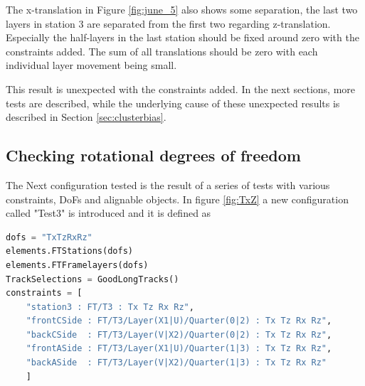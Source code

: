 The x-translation in Figure \ref{fig:june_5} also shows some separation, the last two layers in station 3 are separated from the first two regarding z-translation. Especially the half-layers in the last station should be fixed around zero with the constraints added. The sum of all translations should be zero with each individual layer movement being small.

This result is unexpected with the constraints added. In the next sections, more tests are described, while the underlying cause of these unexpected results is described in Section \ref{sec:clusterbias}.

\subsection{Checking rotational degrees of freedom}
\label{sec:test_and_c5}
The Next configuration tested is the result of a series of tests with various constraints, DoFs and alignable objects. In figure \ref{fig:TxZ} a new configuration called "Test3" is introduced and it is defined as

\begin{lstlisting}[language=Python]
dofs = "TxTzRxRz"
elements.FTStations(dofs)
elements.FTFramelayers(dofs)
TrackSelections = GoodLongTracks()
constraints = [
    "station3 : FT/T3 : Tx Tz Rx Rz",
    "frontCSide : FT/T3/Layer(X1|U)/Quarter(0|2) : Tx Tz Rx Rz",
    "backCSide  : FT/T3/Layer(V|X2)/Quarter(0|2) : Tx Tz Rx Rz",
    "frontASide : FT/T3/Layer(X1|U)/Quarter(1|3) : Tx Tz Rx Rz",
    "backASide  : FT/T3/Layer(V|X2)/Quarter(1|3) : Tx Tz Rx Rz"
    ]
\end{lstlisting}

